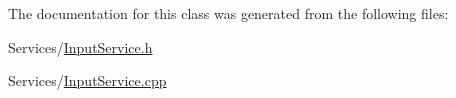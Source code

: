 The documentation for this class was generated from the following files\-:\begin{DoxyCompactItemize}
\item 
Services/\hyperlink{_input_service_8h}{Input\-Service.\-h}\item 
Services/\hyperlink{_input_service_8cpp}{Input\-Service.\-cpp}\end{DoxyCompactItemize}
